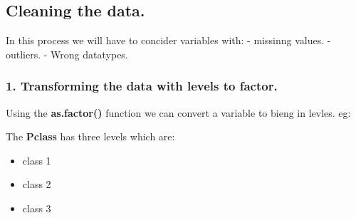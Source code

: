 \documentclass[
]{article}
\newenvironment{Shaded}{\begin{snugshade}}{\end{snugshade}}
\newcommand{\CommentTok}[1]{\textcolor[rgb]{0.56,0.35,0.01}{\textit{#1}}}
\newcommand{\FunctionTok}[1]{\textcolor[rgb]{0.13,0.29,0.53}{\textbf{#1}}}
\newcommand{\NormalTok}[1]{#1}
\newcommand{\OtherTok}[1]{\textcolor[rgb]{0.56,0.35,0.01}{#1}}
\newcommand{\SpecialCharTok}[1]{\textcolor[rgb]{0.81,0.36,0.00}{\textbf{#1}}}
\providecommand{\tightlist}{%
  \setlength{\itemsep}{0pt}\setlength{\parskip}{0pt}}
\begin{document}
\hypertarget{cleaning-the-data.}{%
\subsection{Cleaning the data.}\label{cleaning-the-data.}}

In this process we will have to concider variables with: - missinng
values. - outliers. - Wrong datatypes.

\hypertarget{transforming-the-data-with-levels-to-factor.}{%
\subsubsection{1. Transforming the data with levels to
factor.}\label{transforming-the-data-with-levels-to-factor.}}

Using the \textbf{as.factor()} function we can convert a variable to
bieng in levles. eg:

The \textbf{Pclass} has three levels which are:

\begin{itemize}
\tightlist
\item
  class 1
\item
  class 2
\item
  class 3
\end{itemize}

\begin{Shaded}
\end{Shaded}
\end{document}
